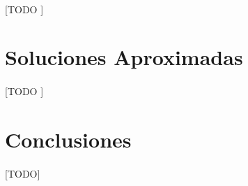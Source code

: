 \documentclass{subfiles}
\begin{document}
      \paragraph{}
      [TODO ]

    \section{Soluciones Aproximadas}
    \label{sec:pagerank_algorithm_approximated}

      \paragraph{}
      [TODO ]

    \section{Conclusiones}
    \label{sec:pagerank_conclusions}

      \paragraph{}
      [TODO]
\end{document}
